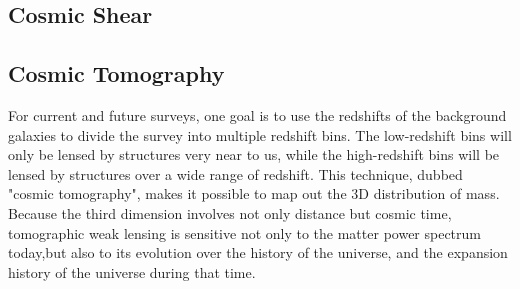 \subsection{Cosmic Shear}

\subsection{Cosmic Tomography}
For current and future surveys, one goal is to use the redshifts of the background galaxies to divide the survey into multiple redshift bins. The low-redshift bins will only be lensed by structures very near to us, while the high-redshift bins will be lensed by structures over a wide range of redshift. This technique, dubbed "cosmic tomography", makes it possible to map out the 3D distribution of mass. Because the third dimension involves not only distance but cosmic time, tomographic weak lensing is sensitive not only to the matter power spectrum today,but also to its evolution over the history of the universe, and the expansion history of the universe during that time.
\cite{lensingbook} \cite{rachel_2018} \cite{hoekstra}

